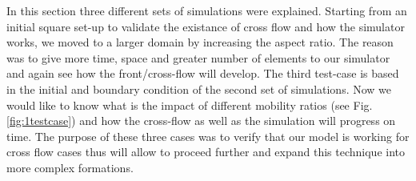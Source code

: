 \documentclass[preprint,authoryear,12pt]{elsarticle}
\begin{document}
\medskip
In this section three different sets of simulations were explained. Starting from an initial square set-up to validate the existance of cross flow and how the simulator works, we moved to a larger domain by increasing the aspect ratio. The reason was to give more time, space and greater number of elements to our simulator and again see how the front/cross-flow will develop. The third test-case is based in the initial and boundary condition of the second set of simulations. Now we would like to know what is the impact of different mobility ratios (see Fig.\ref{fig:1testcase}) and how the cross-flow as well as the simulation will progress on time. The purpose of these three cases was to verify that our model is working for cross flow cases thus will allow to proceed further and expand this technique into more complex formations. 
\end{document}
